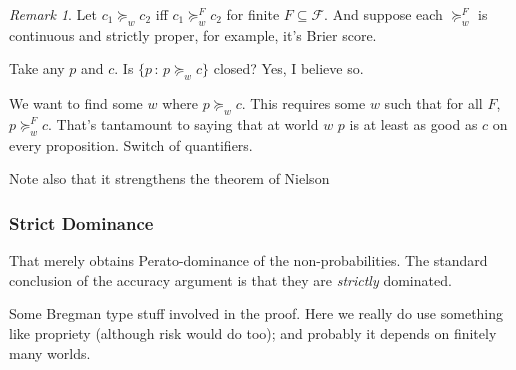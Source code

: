 \documentclass[11pt]{article}
\theoremstyle{definition}
\theoremstyle{remark}
\newtheorem{remark}[theorem]{Remark}
\newcommand{\agenda}{\mathcal F}
\newcommand{\given}{\,:\,}
\begin{document}
\begin{remark}
	Let $c_1\succeq_wc_2$ iff $c_1\succeq_w^Fc_2$ for finite $F\subseteq \agenda$. 
	And suppose each $\succeq_w^F$ is continuous and strictly proper, for example, it's Brier score. 
	
	Take any $p$ and $c$. 	Is $\{p \given p\succeq_w c\}$ closed? Yes, I believe so. 
	
	
	We want to find some $w$ where $p\succeq_w c$. 	This requires some $w$ such that for all $F$, $p\succeq_w^F c$. That's tantamount to saying that at world $w$ $p$ is at least as good as $c$ on every proposition. Switch of quantifiers. 
	
\end{remark}

Note also that it strengthens the theorem of Nielson 

\subsubsection{Strict Dominance}
That merely obtains Perato-dominance of the non-probabilities. The standard conclusion of the accuracy argument is that they are \emph{strictly} dominated. 

Some Bregman type stuff involved in the proof. Here we really do use something like propriety (although risk would do too); and probably it depends on finitely many worlds. 
\end{document}

